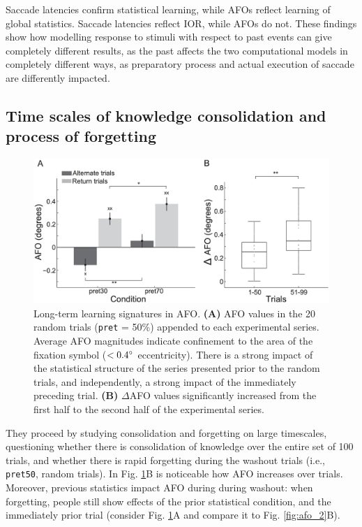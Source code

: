 Saccade latencies confirm statistical learning, while AFOs reflect learning of global statistics. Saccade latencies reflect IOR, while AFOs do not. 
These findings show how modelling response to stimuli with respect to past events can give completely different results, as the past affects the two computational models in completely different ways, as preparatory process and actual execution of saccade are differently impacted.

\subsection{Time scales of knowledge consolidation and process of forgetting}

\begin{figure}[!ht]
    \centering
    \captionsetup{width=.8\linewidth}
    \includegraphics[width=0.55\linewidth]{images/afo_3.png}
    \caption{Long-term learning signatures in AFO. \textbf{(A)} AFO values in the 20 random trials (\texttt{pret} = 50\%) appended to each experimental series. Average AFO magnitudes indicate confinement to the area of the fixation symbol ($<0.4\degree$ eccentricity). There is a strong impact of the statistical structure of the series presented prior to the random trials, and independently, a strong impact of the immediately preceding trial. \textbf{(B)} $\Delta$AFO values significantly increased from the first half to the second half of the experimental series.}
    \label{fig:afo_3}
\end{figure}

They proceed by studying consolidation and forgetting on large timescales, questioning whether there is consolidation of knowledge over the entire set of 100 trials, and whether there is rapid forgetting during the washout trials (i.e., \texttt{pret50}, random trials). In Fig. \ref{fig:afo_3}B is noticeable how AFO increases over trials.
Moreover, previous statistics impact AFO during during washout: when forgetting, people still show effects of the prior statistical condition, and the immediately prior trial (consider Fig. \ref{fig:afo_3}A and compare it to Fig. \ref{fig:afo_2}B).

